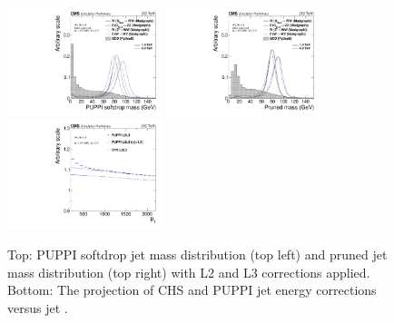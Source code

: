 \begin{figure}[h!]
\centering
\includegraphics[width=0.4\textwidth]{figures/analysis/search2/AN-16-235/plots/gen_SoftdropMass.pdf}
\includegraphics[width=0.4\textwidth]{figures/analysis/search2/AN-16-235/plots/gen_PrunedMass.pdf}\\
\includegraphics[width=0.4\textwidth]{figures/analysis/search2/AN-16-235/plots/JECvsPT.pdf}
\caption{Top: PUPPI softdrop jet mass distribution (top left) and pruned jet mass distribution (top right) with L2 and L3 corrections applied. Bottom: The projection of CHS and PUPPI jet energy corrections versus jet \PT.}
\label{fig:searchII:wtagmass}
\end{figure}


